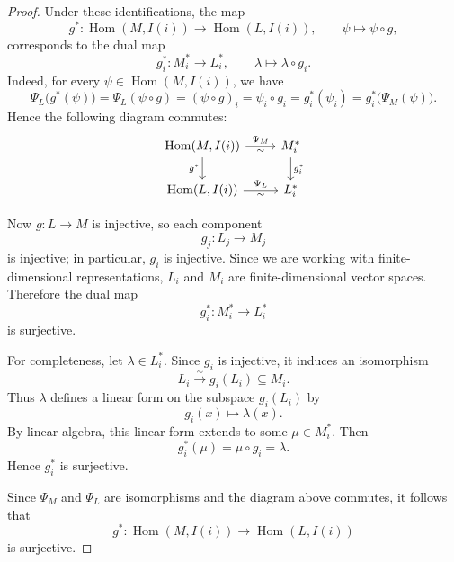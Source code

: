 \documentclass[11pt, a4paper]{article}
\begin{document}
\begin{enumerate}[leftmargin=*, label=\textbf{\arabic*.}]
\begin{proof}
    Under these identifications, the map
    \[
    g^\ast \colon \operatorname{Hom}(M,I(i)) \to \operatorname{Hom}(L,I(i)), 
    \qquad \psi \mapsto \psi\circ g,
    \]
    corresponds to the dual map
    \[
    g_i^{\ast} \colon M_i^{\ast} \to L_i^{\ast}, 
    \qquad \lambda \mapsto \lambda\circ g_i.
    \]
    Indeed, for every \(\psi \in \operatorname{Hom}(M,I(i))\), we have
    \[
    \Psi_L\bigl(g^\ast(\psi)\bigr)
     = \Psi_L(\psi\circ g)
     = (\psi\circ g)_i
     = \psi_i\circ g_i
     = g_i^{\ast}(\psi_i)
     = g_i^{\ast}\bigl(\Psi_M(\psi)\bigr).
    \]
    Hence the following diagram commutes:
    \[
    \begin{tikzcd}
    \operatorname{Hom}(M,I(i)) \arrow[r, "\Psi_M", "\sim"'] \arrow[d, "g^\ast"'] 
    & M_i^\ast \arrow[d, "g_i^\ast"] \\
    \operatorname{Hom}(L,I(i)) \arrow[r, "\Psi_L", "\sim"'] 
    & L_i^\ast
    \end{tikzcd}
    \]
    
    Now \(g\colon L\to M\) is injective, so each component
    \[
    g_j\colon L_j\to M_j
    \]
    is injective; in particular, \(g_i\) is injective. Since we are working with finite-dimensional representations, \(L_i\) and \(M_i\) are finite-dimensional vector spaces. Therefore the dual map
    \[
    g_i^\ast \colon M_i^\ast \to L_i^\ast
    \]
    is surjective.
    
    For completeness, let \(\lambda \in L_i^\ast\). Since \(g_i\) is injective, it induces an isomorphism
    \[
    L_i \xrightarrow{\;\sim\;} g_i(L_i)\subseteq M_i.
    \]
    Thus \(\lambda\) defines a linear form on the subspace \(g_i(L_i)\) by
    \[
    g_i(x)\longmapsto \lambda(x).
    \]
    By linear algebra, this linear form extends to some \(\mu \in M_i^\ast\). Then
    \[
    g_i^\ast(\mu)=\mu\circ g_i=\lambda.
    \]
    Hence \(g_i^\ast\) is surjective.
    
    Since \(\Psi_M\) and \(\Psi_L\) are isomorphisms and the diagram above commutes, it follows that
    \[
    g^\ast \colon \operatorname{Hom}(M,I(i)) \to \operatorname{Hom}(L,I(i))
    \]
    is surjective.
    \end{proof}


\end{enumerate}
\end{document}
